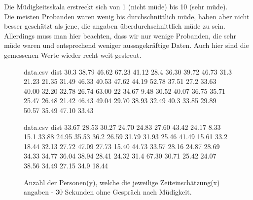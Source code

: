 \documentclass{Paper}
\begin{document}
Die Müdigkeitsskala erstreckt sich von 1 (nicht müde) bis 10 (sehr müde).\\
Die meisten Probanden waren wenig bis durchschnittlich müde, haben aber nicht besser geschätzt als jene, die angaben überdurchschnittlich müde zu sein. Allerdings muss man hier beachten, dass wir nur wenige Probanden, die sehr müde waren und entsprechend weniger aussagekräftige Daten.
Auch hier sind die gemessenen Werte wieder recht weit gestreut.
\linebreak
\linebreak
\begin{figure}[H]
\begin{filecontents}{data.csv}
dist
   30.3 
   38.79 
 46.62 
 67.23 
 41.12 
 28.4 
 36.30 
 39.72 
 46.73 
 31.3 
 21.23 
 21.35 
 31.49 
 46.33 
 40.53 
 47.62 
 44.19 
 52.78 
 37.51 
 27.2 
 33.63 
 40.00 
 32.20 
 32.78 
 26.74 
 63.00 
 22 
 34.67 
 9.48 
 30.52 
 40.07 
 36.75 
 35.71 
 25.47 
 26.48 
 21.42 
 46.43 
 49.04 
 29.70 
 38.93 
 32.49 
 40.3 
 33.85 
 29.89 
 50.57 
 35.49 
 47.10 
 33.43 
\end{filecontents}
\begin{minipage}[t]{0.49\linewidth}
\caption{Anzahl der Personen(y), welche die jeweilige Zeiteinschätzung(x) angaben - 40 Sekunden ohne Gespräch nach Müdigkeit.}
\label{HistZeit40sekMued}
\end{minipage}
\hfill
\begin{filecontents}{data.csv}
dist
  33.67 
 28.53 
 30.27 
 24.70 
 24.83 
 27.60 
 43.42 
 24.17 
 8.33 
 15.1 
 33.88 
 24.95 
 35.53 
 36.2 
 26.59 
 31.79
 31.93 
 25.46 
 41.49 
 15.61 
 33.2
 18.44 
 32.13 
 27.72 
 47.09 
 27.73 
 15.40 
 44.73 
 33.57 
 28.16  
 24.87 
 28.69 
 34.33 
 34.77 
 36.04 
 38.94 
 28.41 
 24.32 
 31.4 
 67.30 
 30.71 
 25.42 
 24.07 
 38.56 
 34.49 
 27.15  
 34.9 
18.44 
\end{filecontents}
\begin{minipage}[t]{0.49\linewidth}
\caption{Anzahl der Personen(y), welche die jeweilige Zeiteinschätzung(x) angaben - 30 Sekunden ohne Gespräch nach Müdigkeit.}
\label{HistZeit30sekMued}
\end{minipage}
\end{figure}
\end{document}
